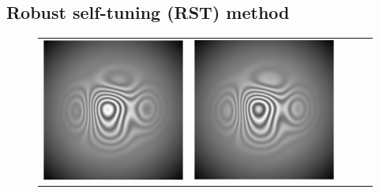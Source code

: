 \documentclass[letterpaper,12pt]{article}   %
\begin{document}
\subsection{Robust self-tuning (RST) method}
\begin{figure}[th]
	\begin{center}
		\begin{tabular}{ c c c c c }
			\includegraphics[scale=0.20]{figures/Interferograma.png} }&
			\includegraphics[scale=0.20]{figures/Interferograma2.png}}&

\end{tabular}
\end{center}
\end{figure}
\end{document}
